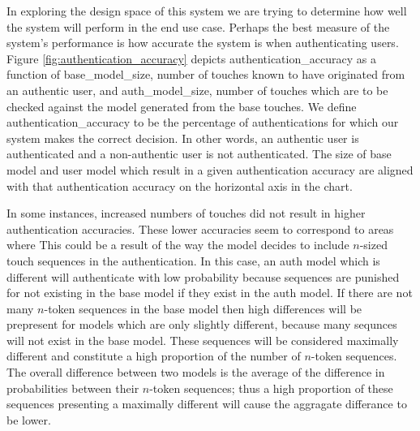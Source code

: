 \documentclass{acm_proc_article-sp}
\begin{document}
%
In exploring the design space of this system we are trying to determine how well the system will perform in the end use case. Perhaps the best measure of the system's performance is how accurate the system is when authenticating users. Figure \ref{fig:authentication_accuracy} depicts authentication\_accuracy as a function of base\_model\_size, number of touches known to have originated from an authentic user, and auth\_model\_size, number of touches which are to be checked against the model generated from the base touches. We define authentication\_accuracy to be the percentage of authentications for which our system makes the correct decision. In other words, an authentic user is authenticated and a non-authentic user is not authenticated. The size of base model and user model which result in a given authentication accuracy are aligned with that authentication accuracy on the horizontal axis in the chart. 

In some instances, increased numbers of touches did not result in higher authentication accuracies. 
These lower accuracies seem to correspond to areas where %
 This could be a result of the way the model decides to include $n$-sized touch sequences in the authentication. 
In this case, an auth model which is  different will authenticate with low probability because sequences are punished for not existing in the base model if they exist in the auth model.
If there are not many $n$-token sequences in the base model then high differences will be prepresent for models which are only slightly different, because many sequnces will not exist in the base model.
These sequences will be considered maximally different and constitute a high proportion of the number of $n$-token sequences.
The overall difference between two models is the average of the difference in probabilities between their $n$-token sequences; thus a high proportion of these sequences presenting a maximally different will cause the aggragate differance to be lower.
\end{document}
